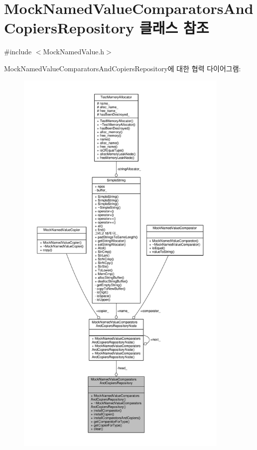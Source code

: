 \hypertarget{class_mock_named_value_comparators_and_copiers_repository}{}\section{Mock\+Named\+Value\+Comparators\+And\+Copiers\+Repository 클래스 참조}
\label{class_mock_named_value_comparators_and_copiers_repository}


{\ttfamily \#include $<$Mock\+Named\+Value.\+h$>$}



Mock\+Named\+Value\+Comparators\+And\+Copiers\+Repository에 대한 협력 다이어그램\+:
\nopagebreak
\begin{figure}[H]
\begin{center}
\leavevmode
\includegraphics[height=550pt]{class_mock_named_value_comparators_and_copiers_repository__coll__graph}
\end{center}
\end{figure}
